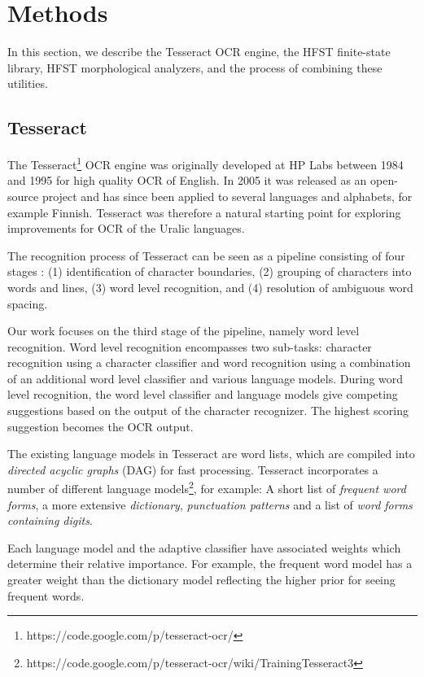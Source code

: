 \documentclass[b5paper]{article}
\begin{document}
\section{Methods}
\label{met} In this section, we describe the Tesseract OCR engine, the
HFST finite-state library, HFST morphological analyzers, and the
process of combining these utilities.

\subsection{Tesseract}
\label{lm}
The Tesseract\footnote{https://code.google.com/p/tesseract-ocr/} OCR
engine \cite{smith07} was originally developed at HP Labs between 1984
and 1995 for high quality OCR of English. In 2005 it was released as
an open-source project and has since been applied to several languages
and alphabets, for example Finnish. Tesseract was therefore a natural
starting point for exploring improvements for OCR of the Uralic languages.

The recognition process of Tesseract can be seen as a pipeline
consisting of four stages \cite{smith07}: (1) identification of
character boundaries, (2) grouping of characters into words and lines,
(3) word level recognition, and (4) resolution of ambiguous word
spacing.

Our work focuses on the third stage of the pipeline, namely word level
recognition. Word level recognition encompasses two sub-tasks: character
recognition using a character classifier and word recognition using a
combination of an additional word level classifier and various
language models. During word level recognition, the word level classifier
and language models give competing suggestions based on the output of
the character recognizer. 
The highest scoring suggestion becomes the OCR output.%

The existing language models in Tesseract are word lists, which are
compiled into {\it directed acyclic graphs} (DAG) for fast
processing. Tesseract incorporates a number of different language
models\footnote{https://code.google.com/p/tesseract-ocr/wiki/TrainingTesseract3},
for example: A short list of {\it frequent word forms}, a more
extensive {\it dictionary}, {\it punctuation patterns} and a list of
{\it word forms containing digits}.

Each language model and the adaptive classifier have associated
weights which determine their relative importance. For example, the
frequent word model has a greater weight than the dictionary
model reflecting the higher prior for seeing frequent words.
\end{document}
